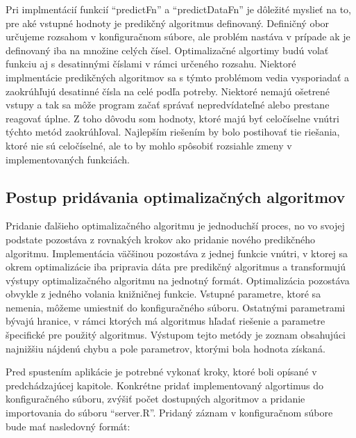 \documentclass[a4paper,slovak,12pt,appendix]{article}
\begin{document}
Pri implmentácií funkcií ``predictFn'' a ``predictDataFn'' je dôležité myslieť
na to, pre aké vstupné hodnoty je predikčný algoritmus definovaný. Definičný
obor určujeme rozsahom v konfiguračnom súbore, ale problém nastáva v prípade
ak je definovaný iba na množine celých čísel. Optimalizačné algortimy budú
volať funkciu aj s desatinnými číslami v rámci určeného rozsahu. Niektoré
implmentácie predikčných algoritmov sa s týmto problémom vedia vysporiadať
a zaokrúhľujú desatinné čísla na celé podľa potreby. Niektoré nemajú ošetrené
vstupy a tak sa môže program začať správať nepredvídateľné alebo prestane
reagovať úplne. Z toho dôvodu som hodnoty, ktoré majú byť celočíselne vnútri
týchto metód zaokrúhľoval. Najlepším riešením by bolo postihovať tie riešania,
ktoré nie sú celočíselné, ale to by mohlo spôsobiť rozsiahle zmeny v
implementovaných funkciách.


\subsection{Postup pridávania optimalizačných algoritmov}
Pridanie ďalšieho optimalizačného algoritmu je jednoduchší proces, no vo
svojej podstate pozostáva z rovnakých krokov ako pridanie nového predikčného
algoritmu. Implementácia väčšinou pozostáva z jednej funkcie vnútri, v ktorej sa
okrem optimalizácie iba pripravia dáta pre predikčný algoritmus a transformujú
výstupy optimalizačného algoritmu na jednotný formát. Optimalizácia pozostáva
obvykle z jedného volania knižničnej funkcie. Vstupné parametre, ktoré sa
nemenia, môžeme umiestniť do konfiguračného súboru. Ostatnými parametrami bývajú
hranice, v rámci ktorých má algoritmus hľadať riešenie a parametre špecifické
pre použitý algoritmus. Výstupom tejto metódy je zoznam obsahujúci najnižšiu
nájdenú chybu a pole parametrov, ktorými bola hodnota získaná.

Pred spustením aplikácie je potrebné vykonať kroky, ktoré boli opísané
v predchádzajúcej kapitole. Konkrétne pridať implementovaný algortimus do
konfiguračného súboru, zvýšiť počet dostupných algoritmov a pridanie
importovania do súboru ``server.R''. Pridaný záznam v konfiguračnom súbore
bude mať nasledovný formát:
\end{document}
